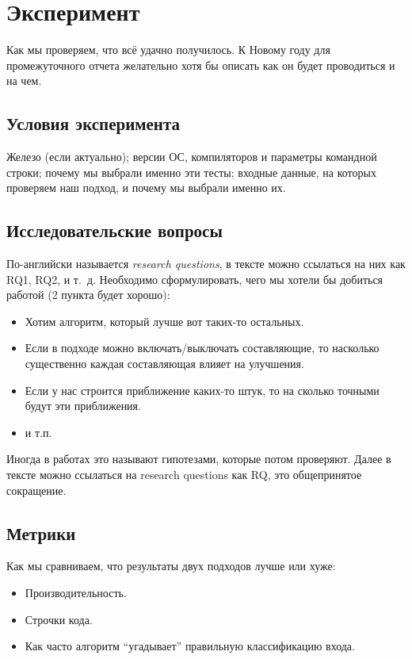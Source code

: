 
\section{Эксперимент}
Как мы проверяем, что  всё удачно получилось.  К Новому году для промежуточного отчета желательно хотя бы описать как он будет прово\-диться и на чем.

\subsection{Условия эксперимента}
Железо (если актуально);  версии ОС, компиляторов и параметры командной строки; почему мы выбрали именно эти тесты; входные дан\-ные, на которых проверяем наш подход, и почему мы выбрали именно их.

\subsection{Исследовательские вопросы }
По-английски называется \emph{research questions}, в тексте можно ссылаться на них как RQ1, RQ2, и т.~д.
Необходимо сформулировать, чего мы хотели бы добиться работой (2 пункта будет хорошо):

\begin{itemize}
	\item Хотим алгоритм, который лучше вот таких-то остальных.
	\item Если в подходе можно включать/выключать составляющие, то насколько существенно каждая составляющая влияет на улучшения.
	\item Если у нас строится приближение каких-то штук, то на сколько точными будут эти приближения.
	\item и т.п.
\end{itemize}

Иногда в работах это называют гипотезами, которые потом проверяют. Далее в тексте можно ссылаться на research questions как \textsc{RQ}, это обще\-при\-нятое сокращение.

\subsection{Метрики}

Как мы сравниваем, что результаты двух подходов лучше или хуже:
\begin{itemize}
	\item Производительность.
	\item Строчки кода.
	\item Как часто алгоритм \enquote{угадывает} правильную классификацию входа.
\end{itemize}

